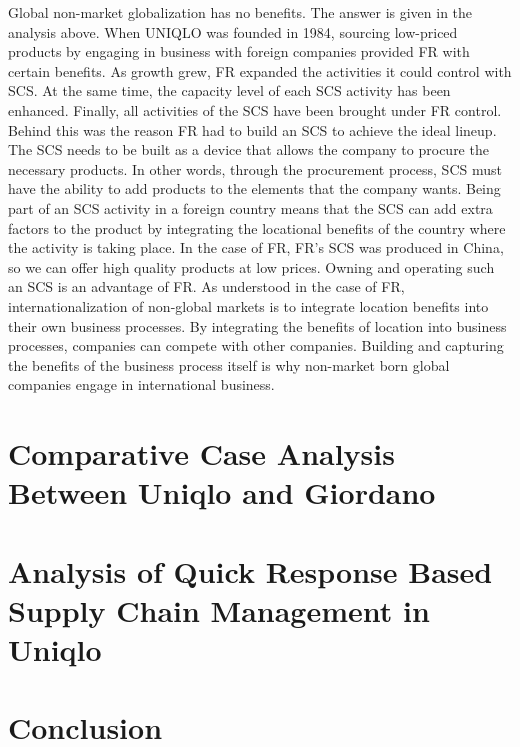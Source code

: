 \documentclass[]{article}
\begin{document}
Global non-market globalization has no benefits. The answer is given in
the analysis above. When UNIQLO was founded in 1984, sourcing low-priced
products by engaging in business with foreign companies provided FR with
certain benefits. As growth grew, FR expanded the activities it could
control with SCS. At the same time, the capacity level of each SCS
activity has been enhanced. Finally, all activities of the SCS have been
brought under FR control. Behind this was the reason FR had to build an
SCS to achieve the ideal lineup. The SCS needs to be built as a device
that allows the company to procure the necessary products. In other
words, through the procurement process, SCS must have the ability to add
products to the elements that the company wants. Being part of an SCS
activity in a foreign country means that the SCS can add extra factors
to the product by integrating the locational benefits of the country
where the activity is taking place. In the case of FR, FR's SCS was
produced in China, so we can offer high quality products at low prices.
Owning and operating such an SCS is an advantage of FR. As understood in
the case of FR, internationalization of non-global markets is to
integrate location benefits into their own business processes. By
integrating the benefits of location into business processes, companies
can compete with other companies. Building and capturing the benefits of
the business process itself is why non-market born global companies
engage in international business.

\hypertarget{comparative-case-analysis-between-uniqlo-and-giordano}{%
\section{Comparative Case Analysis Between Uniqlo and
Giordano}\label{comparative-case-analysis-between-uniqlo-and-giordano}}

\hypertarget{analysis-of-quick-response-based-supply-chain-management-in-uniqlo}{%
\section{Analysis of Quick Response Based Supply Chain Management in
Uniqlo}\label{analysis-of-quick-response-based-supply-chain-management-in-uniqlo}}

\hypertarget{conclusion}{%
\section{Conclusion}\label{conclusion}}
\end{document}
